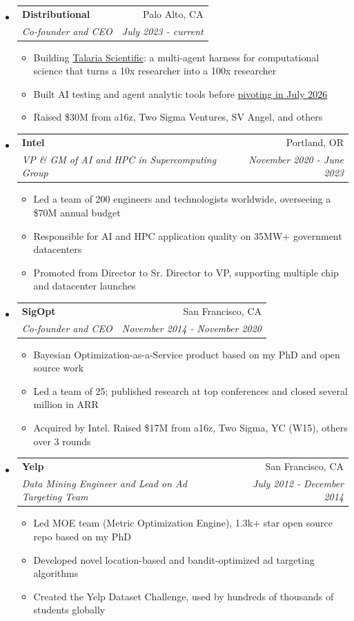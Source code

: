 \documentclass[letterpaper,11pt]{article}
\makeatletter
\newcommand{\resitem}[1]{\item #1 \vspace{-2pt}}
\newcommand{\ressubheading}[4]{
\begin{tabular*}{6.5in}{l@{\cftdotfill{\cftsecdotsep}\extracolsep{\fill}}r}
		\textbf{#1} & #2 \\
		\textit{#3} & \textit{#4} \\
\end{tabular*}\vspace{-4pt}}
\makeatother
\begin{document}
\begin{itemize}
\setlength{\itemsep}{8pt}

\item
	\ressubheading{Distributional}{Palo Alto, CA}{Co-founder and CEO}{July 2023 - current}
	\begin{itemize}
		\resitem{Building \href{https://talariasci.com}{Talaria Scientific}: a multi-agent harness for computational science that turns a 10x researcher into a 100x researcher}
		\resitem{Built AI testing and agent analytic tools before \href{https://distributional.com/blog/distributional-is-now-talaria}{pivoting in July 2026}}
		\resitem{Raised \$30M from a16z, Two Sigma Ventures, SV Angel, and others}
	\end{itemize}

\item
	\ressubheading{Intel}{Portland, OR}{VP \& GM of AI and HPC in Supercomputing Group}{November 2020 - June 2023}
	\begin{itemize}
		\resitem{Led a team of 200 engineers and technologists worldwide, overseeing a \$70M annual budget}
		\resitem{Responsible for AI and HPC application quality on 35MW+ government datacenters}
		\resitem{Promoted from Director to Sr. Director to VP, supporting multiple chip and datacenter launches}
	\end{itemize}

\item
	\ressubheading{SigOpt}{San Francisco, CA}{Co-founder and CEO}{November 2014 - November 2020}
	\begin{itemize}
		\resitem{Bayesian Optimization-as-a-Service product based on my PhD and open source work}
		\resitem{Led a team of 25; published research at top conferences and closed several million in ARR}
		\resitem{Acquired by Intel. Raised \$17M from a16z, Two Sigma, YC (W15), others over 3 rounds}
	\end{itemize}

\item
	\ressubheading{Yelp}{San Francisco, CA}{Data Mining Engineer and Lead on Ad Targeting Team}{July 2012 - December 2014}
	\begin{itemize}
		\resitem{Led MOE team (Metric Optimization Engine), 1.3k+ star open source repo based on my PhD}
		\resitem{Developed novel location-based and bandit-optimized ad targeting algorithms}
		\resitem{Created the Yelp Dataset Challenge, used by hundreds of thousands of students globally}
	\end{itemize}

\end{itemize}
\end{document}
